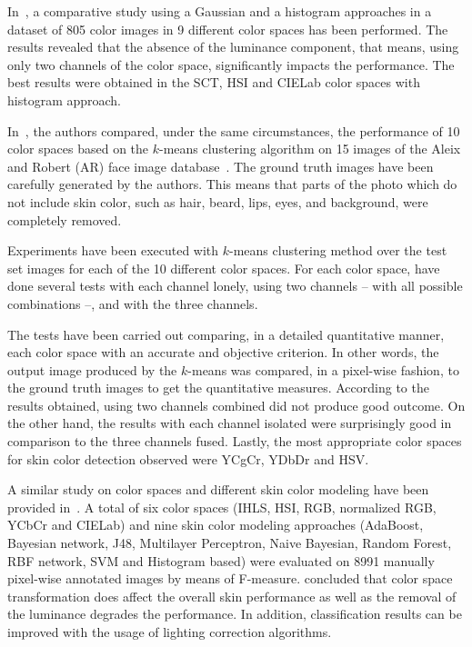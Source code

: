 In~\citet{jayaram:04}, a comparative study using a Gaussian and a histogram approaches in a dataset of 805 color images in 9 different color spaces has been performed. The results revealed that the absence of the luminance component, that means, using only two channels of the color space, significantly impacts the performance. The best results were obtained in the SCT, HSI and CIELab color spaces with histogram approach.

In~\citet{chaves:10}, the authors compared, under the same circumstances, the performance of 10 color spaces based on the $k$-means clustering algorithm on 15 images of the Aleix and Robert (AR) face image database~\citep{ar-face-database:98}. The ground truth images have been carefully generated by the authors. This means that parts of the photo which do not include skin color, such as hair, beard, lips, eyes, and background, were completely removed.

Experiments have been executed with $k$-means clustering method over the test set images for each of the 10 different color spaces. For each color space, \citet{chaves:10} have done several tests with each channel lonely, using two channels -- with all possible combinations --, and with the three channels.

The tests have been carried out comparing, in a detailed quantitative manner, each color space with an accurate and objective criterion. In other words, the output image produced by the $k$-means was compared, in a pixel-wise fashion, to the ground truth images to get the quantitative measures. According to the results obtained, using two channels combined did not produce good outcome. On the other hand, the results with each channel isolated were surprisingly good in comparison to the three channels fused. Lastly, the most appropriate color spaces for skin color detection observed were YCgCr, YDbDr and HSV.

A similar study on color spaces and different skin color modeling have been provided in~\citet{khan:12}. A total of six color spaces (IHLS, HSI, RGB, normalized RGB, YCbCr and CIELab) and nine skin color modeling approaches (AdaBoost, Bayesian network, J48, Multilayer Perceptron, Naive Bayesian, Random Forest, RBF network, SVM and Histogram based) were evaluated on 8991 manually pixel-wise annotated images by means of F-measure. \citet{khan:12} concluded that color space transformation does affect the overall skin performance as well as the removal of the luminance degrades the performance. In addition, classification results can be improved with the usage of lighting correction algorithms.

